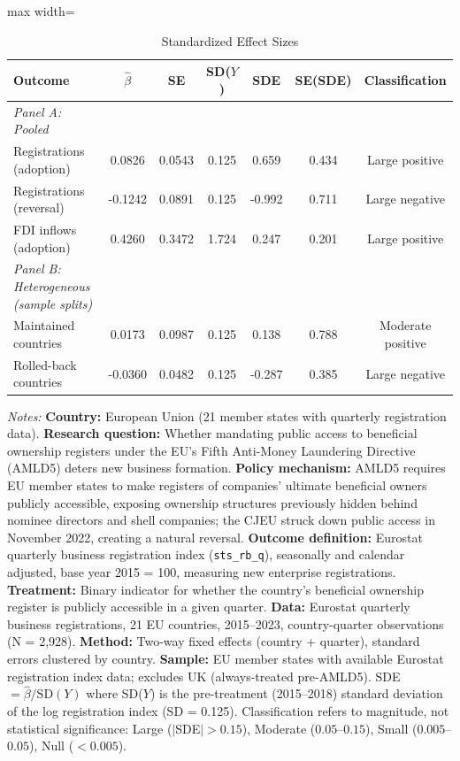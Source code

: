 \begin{table}[t]
\centering
\begin{threeparttable}
\caption{Standardized Effect Sizes}
\label{tab:sde}
\begin{adjustbox}{max width=\textwidth}
\begin{tabular}{lcccccc}
\toprule
Outcome & $\hat{\beta}$ & SE & SD($Y$) & SDE & SE(SDE) & Classification \\
\midrule
\textit{Panel A: Pooled} & & & & & & \\
Registrations (adoption) & 0.0826 & 0.0543 & 0.125 & 0.659 & 0.434 & Large positive \\
Registrations (reversal) & -0.1242 & 0.0891 & 0.125 & -0.992 & 0.711 & Large negative \\
FDI inflows (adoption) & 0.4260 & 0.3472 & 1.724 & 0.247 & 0.201 & Large positive \\
\midrule
\textit{Panel B: Heterogeneous (sample splits)} & & & & & & \\
Maintained countries & 0.0173 & 0.0987 & 0.125 & 0.138 & 0.788 & Moderate positive \\
Rolled-back countries & -0.0360 & 0.0482 & 0.125 & -0.287 & 0.385 & Large negative \\
\bottomrule
\end{tabular}
\end{adjustbox}
\begin{tablenotes}[flushleft]
\small
\item \textit{Notes:} \textbf{Country:} European Union (21 member states with quarterly registration data). \textbf{Research question:} Whether mandating public access to beneficial ownership registers under the EU's Fifth Anti-Money Laundering Directive (AMLD5) deters new business formation. \textbf{Policy mechanism:} AMLD5 requires EU member states to make registers of companies' ultimate beneficial owners publicly accessible, exposing ownership structures previously hidden behind nominee directors and shell companies; the CJEU struck down public access in November 2022, creating a natural reversal. \textbf{Outcome definition:} Eurostat quarterly business registration index (\texttt{sts\_rb\_q}), seasonally and calendar adjusted, base year 2015 = 100, measuring new enterprise registrations. \textbf{Treatment:} Binary indicator for whether the country's beneficial ownership register is publicly accessible in a given quarter. \textbf{Data:} Eurostat quarterly business registrations, 21 EU countries, 2015--2023, country-quarter observations (N = 2,928). \textbf{Method:} Two-way fixed effects (country + quarter), standard errors clustered by country. \textbf{Sample:} EU member states with available Eurostat registration index data; excludes UK (always-treated pre-AMLD5). SDE $= \hat{\beta} / \text{SD}(Y)$ where SD($Y$) is the pre-treatment (2015--2018) standard deviation of the log registration index (SD = 0.125). Classification refers to magnitude, not statistical significance: Large ($|$SDE$| > 0.15$), Moderate ($0.05$--$0.15$), Small ($0.005$--$0.05$), Null ($< 0.005$).
\end{tablenotes}
\end{threeparttable}
\end{table}
